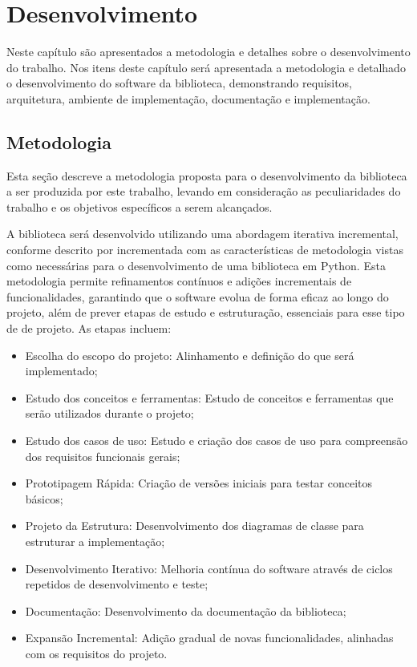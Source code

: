 \chapter{Desenvolvimento}
Neste capítulo são apresentados a metodologia e detalhes sobre o desenvolvimento do trabalho.
Nos itens deste capítulo será apresentada a metodologia e detalhado o desenvolvimento do software da biblioteca,
demonstrando requisitos, arquitetura, ambiente de implementação, documentação e implementação.


\section{Metodologia}
Esta seção descreve a metodologia proposta para o desenvolvimento da biblioteca a ser produzida por este trabalho,
levando em consideração as peculiaridades do trabalho e os objetivos específicos a serem alcançados.

A biblioteca será desenvolvido utilizando uma abordagem iterativa incremental, conforme descrito por \cite{met}
incrementada com as características de metodologia vistas como necessárias para o desenvolvimento de uma biblioteca em
Python.
Esta metodologia permite refinamentos contínuos e adições incrementais de funcionalidades, garantindo que o software
evolua de forma eficaz ao longo do projeto, além de prever etapas de estudo e estruturação, essenciais para esse
tipo de de projeto.
As etapas incluem:

\begin{itemize}
    \item Escolha do escopo do projeto: Alinhamento e definição do que será implementado;
    \item Estudo dos conceitos e ferramentas: Estudo de conceitos e ferramentas que serão utilizados durante o projeto;
    \item Estudo dos casos de uso: Estudo e criação dos casos de uso para compreensão dos requisitos funcionais gerais;
    \item Prototipagem Rápida: Criação de versões iniciais para testar conceitos básicos;
    \item Projeto da Estrutura: Desenvolvimento dos diagramas de classe para estruturar a implementação;
    \item Desenvolvimento Iterativo: Melhoria contínua do software através de ciclos repetidos de desenvolvimento e teste;
    \item Documentação: Desenvolvimento da documentação da biblioteca;
    \item Expansão Incremental: Adição gradual de novas funcionalidades, alinhadas com os requisitos do projeto.
\end{itemize}

